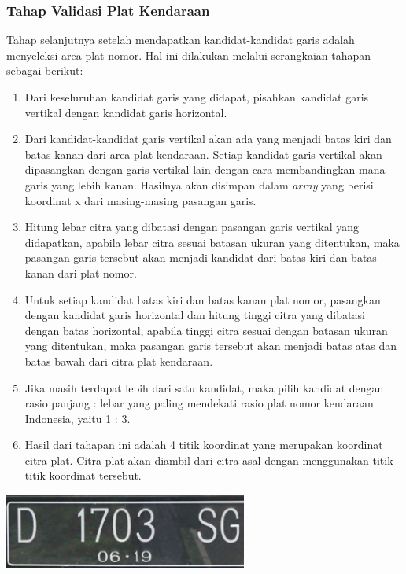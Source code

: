 \subsubsection{Tahap Validasi Plat Kendaraan}
\noindent Tahap selanjutnya setelah mendapatkan kandidat-kandidat garis adalah menyeleksi area plat nomor. Hal ini dilakukan melalui serangkaian tahapan sebagai berikut:
\begin{enumerate}
	\item Dari keseluruhan kandidat garis yang didapat, pisahkan kandidat garis vertikal dengan kandidat garis horizontal.
	\item Dari kandidat-kandidat garis vertikal akan ada yang menjadi batas kiri dan batas kanan dari area plat kendaraan. Setiap kandidat garis vertikal akan dipasangkan dengan garis vertikal lain dengan cara membandingkan mana garis yang lebih kanan. Hasilnya akan disimpan dalam \textit{array} yang berisi koordinat x dari masing-masing pasangan garis.
	\item Hitung lebar citra yang dibatasi dengan pasangan garis vertikal yang didapatkan, apabila lebar citra sesuai batasan ukuran yang ditentukan, maka pasangan garis tersebut akan menjadi kandidat dari batas kiri dan batas kanan dari plat nomor.
	\item Untuk setiap kandidat batas kiri dan batas kanan plat nomor, pasangkan dengan kandidat garis horizontal dan hitung tinggi citra yang dibatasi dengan batas horizontal, apabila tinggi citra sesuai dengan batasan ukuran yang ditentukan, maka pasangan garis tersebut akan menjadi batas atas dan batas bawah dari citra plat kendaraan.
	\item Jika masih terdapat lebih dari satu kandidat, maka pilih kandidat dengan rasio panjang : lebar yang paling mendekati rasio plat nomor kendaraan Indonesia, yaitu 1 : 3.
	\item Hasil dari tahapan ini adalah 4 titik koordinat yang merupakan koordinat citra plat. Citra plat akan diambil dari citra asal dengan menggunakan titik-titik koordinat tersebut.
\end{enumerate}

\begin{adjustbox}{width=1\textwidth}
	\noindent\begin{minipage}{\linewidth}
		\centering\includegraphics[width=8cm]{images/HasilPlat.png}
		\label{fig:OutputPlat}
	\end{minipage}
\end{adjustbox}\\

